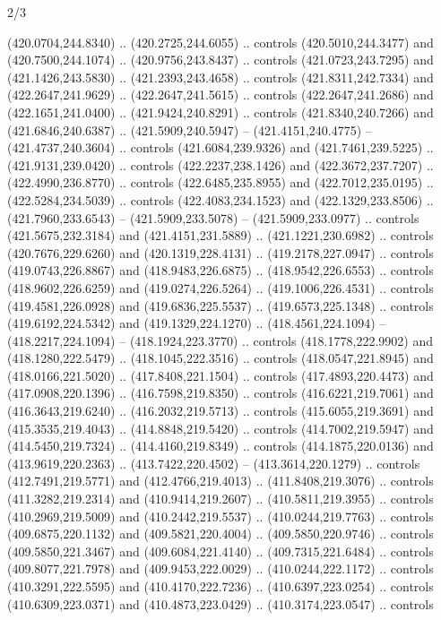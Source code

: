 \begin{flagdescription}{2/3}
\begin{scope}[xshift=0.5\flaglength,yshift=0.5\flagwidth,scale=\flagwidth/495.65]
\begin{scope}[y=0.8pt, x=0.8pt, yscale=-1,shift={(-463.76,-309.78)}]
  (420.0704,244.8340) .. (420.2725,244.6055) .. controls (420.5010,244.3477) and
  (420.7500,244.1074) .. (420.9756,243.8437) .. controls (421.0723,243.7295) and
  (421.1426,243.5830) .. (421.2393,243.4658) .. controls (421.8311,242.7334) and
  (422.2647,241.9629) .. (422.2647,241.5615) .. controls (422.2647,241.2686) and
  (422.1651,241.0400) .. (421.9424,240.8291) .. controls (421.8340,240.7266) and
  (421.6846,240.6387) .. (421.5909,240.5947) -- (421.4151,240.4775) --
  (421.4737,240.3604) .. controls (421.6084,239.9326) and (421.7461,239.5225) ..
  (421.9131,239.0420) .. controls (422.2237,238.1426) and (422.3672,237.7207) ..
  (422.4990,236.8770) .. controls (422.6485,235.8955) and (422.7012,235.0195) ..
  (422.5284,234.5039) .. controls (422.4083,234.1523) and (422.1329,233.8506) ..
  (421.7960,233.6543) -- (421.5909,233.5078) -- (421.5909,233.0977) .. controls
  (421.5675,232.3184) and (421.4151,231.5889) .. (421.1221,230.6982) .. controls
  (420.7676,229.6260) and (420.1319,228.4131) .. (419.2178,227.0947) .. controls
  (419.0743,226.8867) and (418.9483,226.6875) .. (418.9542,226.6553) .. controls
  (418.9602,226.6259) and (419.0274,226.5264) .. (419.1006,226.4531) .. controls
  (419.4581,226.0928) and (419.6836,225.5537) .. (419.6573,225.1348) .. controls
  (419.6192,224.5342) and (419.1329,224.1270) .. (418.4561,224.1094) --
  (418.2217,224.1094) -- (418.1924,223.3770) .. controls (418.1778,222.9902) and
  (418.1280,222.5479) .. (418.1045,222.3516) .. controls (418.0547,221.8945) and
  (418.0166,221.5020) .. (417.8408,221.1504) .. controls (417.4893,220.4473) and
  (417.0908,220.1396) .. (416.7598,219.8350) .. controls (416.6221,219.7061) and
  (416.3643,219.6240) .. (416.2032,219.5713) .. controls (415.6055,219.3691) and
  (415.3535,219.4043) .. (414.8848,219.5420) .. controls (414.7002,219.5947) and
  (414.5450,219.7324) .. (414.4160,219.8349) .. controls (414.1875,220.0136) and
  (413.9619,220.2363) .. (413.7422,220.4502) -- (413.3614,220.1279) .. controls
  (412.7491,219.5771) and (412.4766,219.4013) .. (411.8408,219.3076) .. controls
  (411.3282,219.2314) and (410.9414,219.2607) .. (410.5811,219.3955) .. controls
  (410.2969,219.5009) and (410.2442,219.5537) .. (410.0244,219.7763) .. controls
  (409.6875,220.1132) and (409.5821,220.4004) .. (409.5850,220.9746) .. controls
  (409.5850,221.3467) and (409.6084,221.4140) .. (409.7315,221.6484) .. controls
  (409.8077,221.7978) and (409.9453,222.0029) .. (410.0244,222.1172) .. controls
  (410.3291,222.5595) and (410.4170,222.7236) .. (410.6397,223.0254) .. controls
  (410.6309,223.0371) and (410.4873,223.0429) .. (410.3174,223.0547) .. controls

\end{scope}
\end{scope}
\end{flagdescription}
